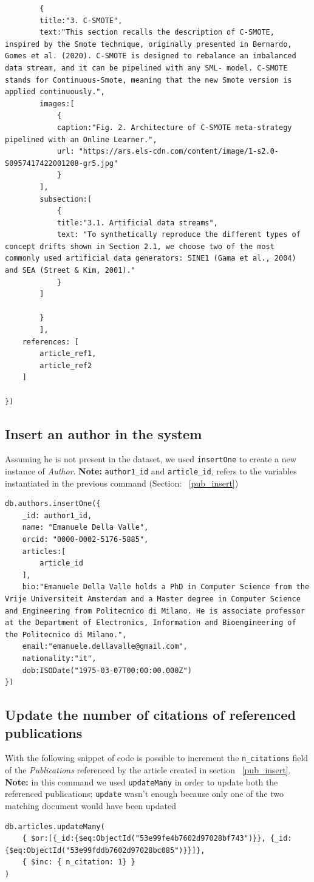 \documentclass{Configuration_Files/PoliMi3i_thesis}
\begin{document}
\begin{lstlisting}
		{
		title:"3. C-SMOTE",
		text:"This section recalls the description of C-SMOTE, inspired by the Smote technique, originally presented in Bernardo, Gomes et al. (2020). C-SMOTE is designed to rebalance an imbalanced data stream, and it can be pipelined with any SML- model. C-SMOTE stands for Continuous-Smote, meaning that the new Smote version is applied continuously.",
		images:[
			{
			caption:"Fig. 2. Architecture of C-SMOTE meta-strategy pipelined with an Online Learner.",
			url: "https://ars.els-cdn.com/content/image/1-s2.0-S0957417422001208-gr5.jpg"
			}
		],
		subsection:[
			{
			title:"3.1. Artificial data streams",
			text: "To synthetically reproduce the different types of concept drifts shown in Section 2.1, we choose two of the most commonly used artificial data generators: SINE1 (Gama et al., 2004) and SEA (Street & Kim, 2001)."
			}
		]

		}
		],
	references: [
		article_ref1,
		article_ref2
	]

})
\end{lstlisting}


\subsection{Insert an author in the system}
Assuming he is not present in the dataset, we used \verb |insertOne| to create a new instance of \emph{Author}.\newline
\textbf{Note:} \verb |author1_id| and \verb|article_id|, refers to the variables instantiated in the previous
command (Section: ~\ref{pub_insert})
\begin{lstlisting}
db.authors.insertOne({
	_id: author1_id,
	name: "Emanuele Della Valle",
	orcid: "0000-0002-5176-5885",
	articles:[
		article_id
	],
	bio:"Emanuele Della Valle holds a PhD in Computer Science from the Vrije Universiteit Amsterdam and a Master degree in Computer Science and Engineering from Politecnico di Milano. He is associate professor at the Department of Electronics, Information and Bioengineering of the Politecnico di Milano.",
	email:"emanuele.dellavalle@gmail.com",
	nationality:"it",
	dob:ISODate("1975-03-07T00:00:00.000Z")
})
\end{lstlisting}

\subsection{Update the number of citations of referenced publications}
With the following snippet of code is possible to increment the \verb |n_citations| field of the \emph{Publications}
referenced by the article created in section ~\ref{pub_insert}.\newline
\textbf{Note:} in this command we used \verb |updateMany| in order to update both the referenced publications; \verb |update|
wasn't enough because only one of the two matching document would have been updated\\
\begin{lstlisting}
db.articles.updateMany(
	{ $or:[{_id:{$eq:ObjectId("53e99fe4b7602d97028bf743")}}, {_id:{$eq:ObjectId("53e99fddb7602d97028bc085")}}]},
	{ $inc: { n_citation: 1} }
)
\end{lstlisting}
\end{document}

